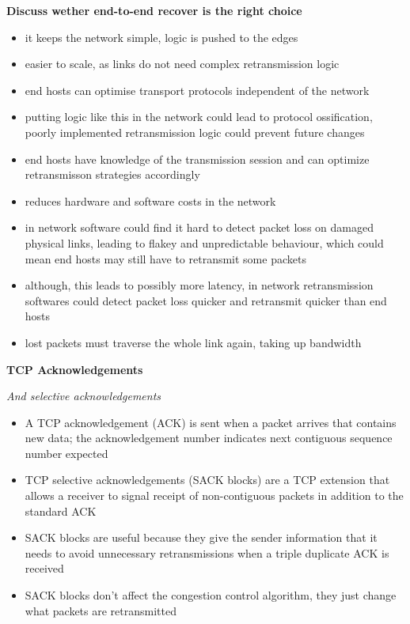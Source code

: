 \documentclass{article}
\begin{document}
\textbf{Discuss wether end-to-end recover is the right choice}
\begin{itemize}
    \item it keeps the network simple, logic is pushed to the edges
    \item easier to scale, as links do not need complex retransmission logic
    \item end hosts can optimise transport protocols independent of the network
    \item putting logic like this in the network could lead to protocol ossification, poorly implemented retransmission logic could prevent future changes
    \item end hosts have knowledge of the transmission session and can optimize retransmisson strategies accordingly
    \item reduces hardware and software costs in the network
    \item in network software could find it hard to detect packet loss on damaged physical links, leading to flakey and unpredictable behaviour, which could mean end hosts may still have to retransmit some packets
    \item although, this leads to possibly more latency, in network retransmission softwares could detect packet loss quicker and retransmit quicker than end hosts
    \item lost packets must traverse the whole link again, taking up bandwidth
\end{itemize}

\textbf{TCP Acknowledgements}

\textit{And selective acknowledgements}
\begin{itemize}
    \item A TCP acknowledgement (ACK) is sent when a packet arrives that contains new data; the
    acknowledgement number indicates next contiguous sequence number expected
    \item TCP selective acknowledgements (SACK blocks) are a TCP extension that allows a receiver
    to signal receipt of non-contiguous packets in addition to the standard ACK
    \item SACK blocks are useful because they give the sender information that it needs to avoid
    unnecessary retransmissions when a triple duplicate ACK is received
    \item SACK blocks don't affect the congestion control algorithm, they just change what packets
    are retransmitted
\end{itemize}
\end{document}

